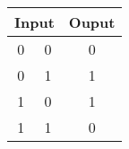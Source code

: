 \documentclass{standalone}
\begin{document}
\begin{tabular}{ccc}
	\toprule
		\multicolumn{2}{c}{Input} & Ouput\\
	\midrule
		0 & 0 & 0\\
		0 & 1 & 1\\
		1 & 0 & 1\\
		1 & 1 & 0\\
	\bottomrule
\end{tabular}
\end{document}
